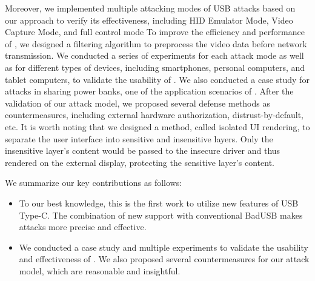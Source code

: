 Moreover, we implemented multiple attacking
modes of \ac{USB} attacks based on our approach to verify its effectiveness,
including \ac{HID} Emulator Mode, Video Capture Mode, and full control mode  To improve the
efficiency and performance of \tool, we designed a filtering algorithm to
preprocess the video data before network transmission.
We conducted
a series of experiments for each attack mode as well as for different types of
devices, including smartphones, personal computers, and tablet computers, to
validate the usability of \tool.  We also conducted a case study for attacks in
sharing power banks, one of the application scenarios of \tool.
After the validation of our attack model, we
proposed several defense methods as countermeasures, including external
hardware authorization, distrust-by-default, etc.  It is worth noting that we
designed a method, called isolated \ac{UI} rendering, to separate the user interface
into sensitive and insensitive layers.  Only the insensitive layer's content would be passed to the insecure driver and thus rendered on the external display, protecting the sensitive layer's content.

We summarize our key contributions as follows:

\begin{itemize}

    \item To our best knowledge, this is the first work to utilize new features
	of \ac{USB} Type-C.  The combination of new support with conventional BadUSB
	makes attacks more precise and effective.


    \item We conducted a case study and multiple experiments to validate the
	usability and effectiveness of \tool.  We also proposed several
	countermeasures for our attack model, which are reasonable and
	insightful.
\end{itemize}

